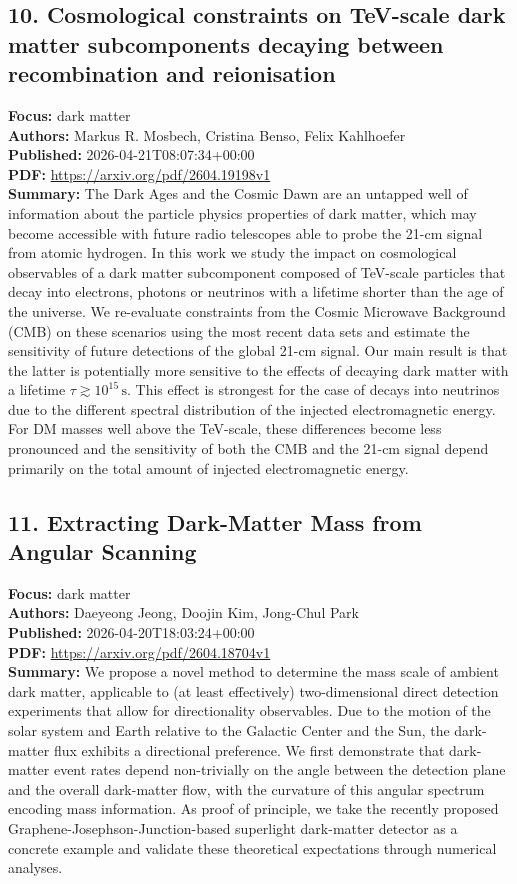 \documentclass[11pt]{article}
\begin{document}
\subsection*{10. Cosmological constraints on TeV-scale dark matter subcomponents decaying between recombination and reionisation}
\textbf{Focus:} dark matter\\
\textbf{Authors:} Markus R. Mosbech, Cristina Benso, Felix Kahlhoefer\\
\textbf{Published:} 2026-04-21T08:07:34+00:00\\
\textbf{PDF:} \href{https://arxiv.org/pdf/2604.19198v1}{https://arxiv.org/pdf/2604.19198v1}\\
\textbf{Summary:}
The Dark Ages and the Cosmic Dawn are an untapped well of information about the particle physics properties of dark matter, which may become accessible with future radio telescopes able to probe the 21-cm signal from atomic hydrogen. In this work we study the impact on cosmological observables of a dark matter subcomponent composed of TeV-scale particles that decay into electrons, photons or neutrinos with a lifetime shorter than the age of the universe. We re-evaluate constraints from the Cosmic Microwave Background (CMB) on these scenarios using the most recent data sets and estimate the sensitivity of future detections of the global 21-cm signal. Our main result is that the latter is potentially more sensitive to the effects of decaying dark matter with a lifetime $\tau \gtrsim 10^{15} \, \mathrm{s}$. This effect is strongest for the case of decays into neutrinos due to the different spectral distribution of the injected electromagnetic energy. For DM masses well above the TeV-scale, these differences become less pronounced and the sensitivity of both the CMB and the 21-cm signal depend primarily on the total amount of injected electromagnetic energy.
\newpage
\subsection*{11. Extracting Dark-Matter Mass from Angular Scanning}
\textbf{Focus:} dark matter\\
\textbf{Authors:} Daeyeong Jeong, Doojin Kim, Jong-Chul Park\\
\textbf{Published:} 2026-04-20T18:03:24+00:00\\
\textbf{PDF:} \href{https://arxiv.org/pdf/2604.18704v1}{https://arxiv.org/pdf/2604.18704v1}\\
\textbf{Summary:}
We propose a novel method to determine the mass scale of ambient dark matter, applicable to (at least effectively) two-dimensional direct detection experiments that allow for directionality observables. Due to the motion of the solar system and Earth relative to the Galactic Center and the Sun, the dark-matter flux exhibits a directional preference. We first demonstrate that dark-matter event rates depend non-trivially on the angle between the detection plane and the overall dark-matter flow, with the curvature of this angular spectrum encoding mass information. As proof of principle, we take the recently proposed Graphene-Josephson-Junction-based superlight dark-matter detector as a concrete example and validate these theoretical expectations through numerical analyses.
\end{document}
